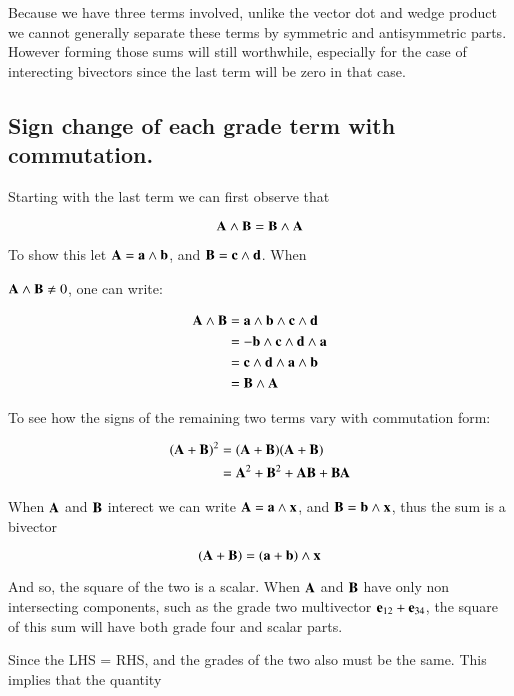 \documentclass{article}      %
\begin{document}
Because we have three terms involved, unlike the vector dot and wedge product
we cannot generally separate these terms by 
symmetric and antisymmetric parts.  However forming those sums
will still worthwhile, especially for the case of interecting bivectors
since the last term will be zero in that case.

\subsection{ Sign change of each grade term with commutation. }

Starting with the last term we can first observe that

\begin{equation}\label{eqn:wedgesign}
\mathbf{A} \wedge \mathbf{B} = \mathbf{B} \wedge \mathbf{A}
\end{equation}

To show this let $\mathbf{A} = \mathbf{a} \wedge \mathbf{b}$, and $\mathbf{B} = \mathbf{c} \wedge \mathbf{d}$.  When

$\mathbf{A} \wedge \mathbf{B} \ne 0$, one can write:

\begin{align*}
\mathbf{A} \wedge \mathbf{B} 
&= \mathbf{a} \wedge \mathbf{b} \wedge \mathbf{c} \wedge \mathbf{d} \\
&= - \mathbf{b} \wedge \mathbf{c} \wedge \mathbf{d} \wedge \mathbf{a} \\
&= \mathbf{c} \wedge \mathbf{d} \wedge \mathbf{a} \wedge \mathbf{b} \\
&= \mathbf{B} \wedge \mathbf{A} \\
\end{align*}

To see how the signs of the remaining two terms vary with commutation
form:

\begin{align*}
(\mathbf{A} + \mathbf{B})^2
&= (\mathbf{A} + \mathbf{B})(\mathbf{A} + \mathbf{B}) \\
&= \mathbf{A}^2 + \mathbf{B}^2 + \mathbf{A} \mathbf{B} + \mathbf{B} \mathbf{A} \\
\end{align*}

When $\mathbf{A}$ and $\mathbf{B}$ interect we can write
$\mathbf{A} = \mathbf{a} \wedge \mathbf{x}$, and $\mathbf{B} = \mathbf{b} \wedge \mathbf{x}$, thus the sum is a bivector

\[
(\mathbf{A} + \mathbf{B})
= (\mathbf{a} + \mathbf{b}) \wedge \mathbf{x}
\]

And so, the square of the two is a scalar.  When $\mathbf{A}$ and $\mathbf{B}$ have only
non intersecting components, such as the grade two  multivector
$\mathbf{e}_{12} + \mathbf{e}_{34}$, the square of this sum will have both grade four and
scalar parts.

Since the LHS = RHS, and the grades of the two also must be the same.
This implies that the quantity
\end{document}
